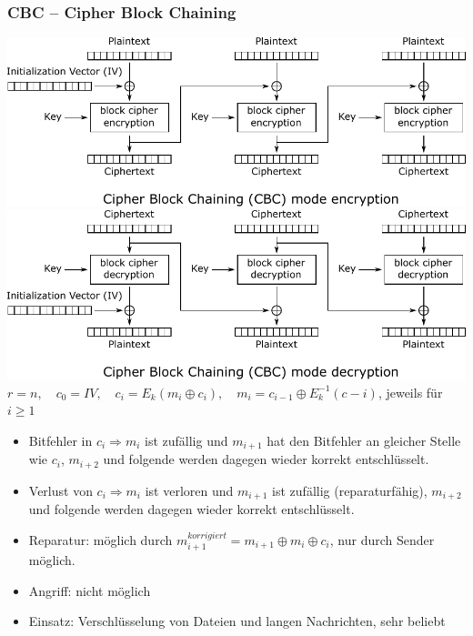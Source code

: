 \documentclass[8pt,a4paper,landscape]{article}
\begin{document}
\begin{multicols}{4}
\subsubsection{CBC – Cipher Block Chaining}
\includegraphics[width=\columnwidth]{CBC_encryption.pdf}
\includegraphics[width=\columnwidth]{CBC_decryption.pdf}
\(r=n, \quad c_0 = IV, \quad c_i = E_k(m_i \oplus c_i), \quad m_i = c_{i-1} \oplus E^{-1}_k (c-i)\), jeweils für $i\geq 1$\begin{itemize}[itemsep=1pt]
\item Bitfehler in \(c_i \Rightarrow m_i \) ist zufällig und  \(m_{i+1}\) hat den Bitfehler an gleicher Stelle wie \(c_i\), \(m_{i+2}\) und folgende werden dagegen wieder korrekt entschlüsselt.
\item Verlust von \(c_i \Rightarrow m_i \) ist verloren und  \(m_{i+1}\) ist zufällig (reparaturfähig), \(m_{i+2}\) und folgende werden dagegen wieder korrekt entschlüsselt.
\item Reparatur:  möglich durch $m_{i+1}^{korrigiert} = m_{i+1} \oplus m_i \oplus c_i$, nur durch Sender möglich.
\item Angriff: nicht möglich
\item Einsatz: Verschlüsselung von Dateien und langen Nachrichten, sehr beliebt
\end{itemize}


\end{multicols}
\end{document}
